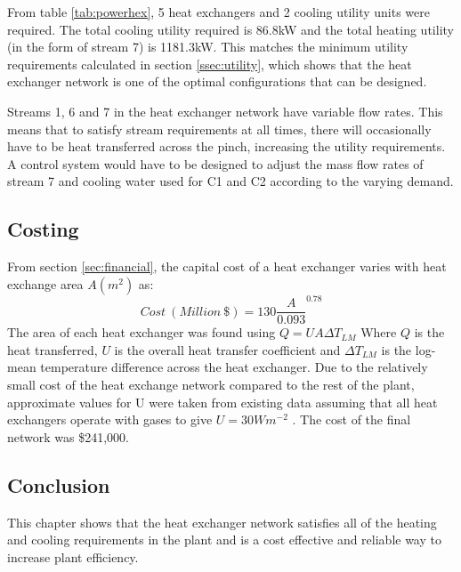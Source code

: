 \documentclass[11pt, oneside]{article}
\begin{document}
From table \ref{tab:powerhex}, 5 heat exchangers and 2 cooling utility units were required. The total cooling utility required is 86.8kW and the total heating utility (in the form of stream 7) is 1181.3kW. This matches the minimum utility requirements calculated in section \ref{ssec:utility}, which shows that the heat exchanger network is one of the optimal configurations that can be designed.

Streams 1, 6 and 7 in the heat exchanger network have variable flow rates. This means that to satisfy stream requirements at all times, there will occasionally have to be heat transferred across the pinch, increasing the utility requirements. A control system would have to be designed to adjust the mass flow rates of stream 7 and cooling water used for C1 and C2 according to the varying demand.

\subsection{Costing}
From section \ref{sec:financial}, the capital cost of a heat exchanger varies with heat exchange area $A (m^2)$ as:
\begin{equation} %
Cost \ (Million\ \$) = 130 \frac{A}{0.093}^{0.78}
\end{equation}
The area of each heat exchanger was found using $Q = UA\Delta T_{LM}$
Where $Q$ is the heat transferred, $U$ is the overall heat transfer coefficient and $\Delta T_{LM}$ is the log-mean temperature difference across the heat exchanger. Due to the relatively small cost of the heat exchange network compared to the rest of the plant, approximate values for U were taken from existing data assuming that all heat exchangers operate with gases to give $U=30Wm^{-2}$ \cite{hexcoeff}. The cost of the final network was \$241,000. 

\subsection{Conclusion}
This chapter shows that the heat exchanger network satisfies all of the heating and cooling requirements in the plant and is a cost effective and reliable way to increase plant efficiency. 


%

\end{document}

